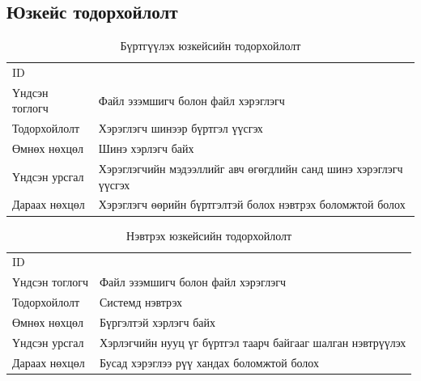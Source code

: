 \subsection*{Юзкейс тодорхойлолт}
\begin{table}[H]
    \label{tab:treatments}
    \footnotesize
    \centering
    \begin{tabularx}{\textwidth}{|>{\hsize=0.3\hsize}X|>{\hsize=0.7\hsize}X|}
        \hline
        \multicolumn{2}{|c|}{Бүртгүүлэх} \\
        \hline
        ID & 1 \\
        \hline
        Үндсэн тоглогч & Файл эзэмшигч болон файл хэрэглэгч\\
        \hline
        Тодорхойлолт & Хэрэглэгч шинээр бүртгэл үүсгэх\\
        \hline
        Өмнөх нөхцөл & Шинэ хэрлэгч байх\\
        \hline
        Үндсэн урсгал & Хэрэглэгчийн мэдээллийг авч өгөгдлийн санд шинэ хэрэглэгч үүсгэх\\
        \hline
        Дараах нөхцөл & Хэрэглэгч өөрийн бүртгэлтэй болох нэвтрэх боломжтой болох\\
        \hline
    \end{tabularx}
    \caption{Бүртгүүлэх юзкейсийн тодорхойлолт}
\end{table}

\begin{table}[H]
    \footnotesize
    \centering
    \begin{tabularx}{\textwidth}{|>{\hsize=0.3\hsize}X|>{\hsize=0.7\hsize}X|}
        \hline
        \multicolumn{2}{|c|}{Нэвтрэх} \\
        \hline
        ID & 2\\
        \hline
        Үндсэн тоглогч & Файл эзэмшигч болон файл хэрэглэгч\\
        \hline
        Тодорхойлолт & Системд нэвтрэх\\
        \hline
        Өмнөх нөхцөл & Бүргэлтэй хэрлэгч байх\\
        \hline
        Үндсэн урсгал & Хэрлэгчийн нууц үг бүртгэл таарч байгааг шалган нэвтрүүлэх\\
        \hline
        Дараах нөхцөл & Бусад хэрэглээ рүү хандах боломжтой болох\\
        \hline
    \end{tabularx}
    \caption{Нэвтрэх юзкейсийн тодорхойлолт}
\end{table}

